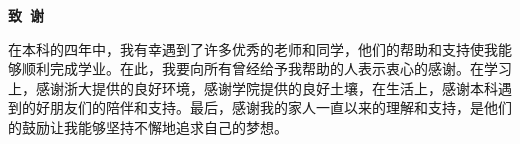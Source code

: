 \cleardoublepage{}
\begin{center}
    \bfseries {} 致~谢
\end{center}
在本科的四年中，我有幸遇到了许多优秀的老师和同学，他们的帮助和支持使我能够顺利完成学业。在此，我要向所有曾经给予我帮助的人表示衷心的感谢。在学习上，感谢浙大提供的良好环境，感谢学院提供的良好土壤，在生活上，感谢本科遇到的好朋友们的陪伴和支持。最后，感谢我的家人一直以来的理解和支持，是他们的鼓励让我能够坚持不懈地追求自己的梦想。